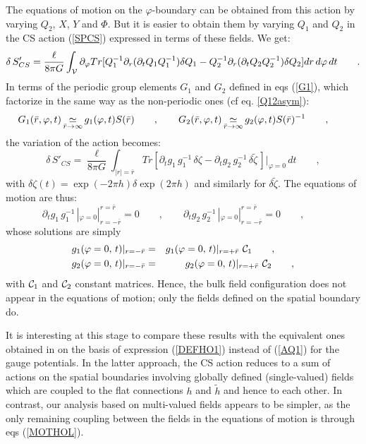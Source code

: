 \documentclass[a4paper,10pt]{article}
\begin{document}
The equations of motion on the $\varphi$-boundary can be obtained from this
action by varying $Q_2$, $X$, $Y$ and $\Phi$. But it is easier to obtain 
them by varying $Q_1$ and $Q_2$ in the CS action (\ref{SPCS}) 
expressed in terms of these fields. We get:
\begin{equation}
\delta \, S'_{CS}= 
\frac \ell {8 \pi G} \int_{\cal V} \partial _\varphi
Tr[Q_1^{-1} \partial_r(\partial_t Q_1 Q_1^{-1}) \delta Q_1 -
 Q_2^{-1} \partial_r(\partial_t Q_2 Q_2^{-1}) \delta Q_2] 
dr\,d\varphi\,dt \qquad. 
\end{equation}
In terms of the periodic group elements $G_1$ and $G_2$ defined in eqs
(\ref{G1}), which factorize in the same way as the non-periodic ones
(cf eq. \ref{Q12asym}):
\begin{equation}
G_1(\bar r,\varphi,t)\mathop {\simeq} \limits_{\bar r \rightarrow \infty}
g_1(\varphi,t) S(\bar r) \qquad , \qquad
G_2(\bar r,\varphi,t)\mathop {\simeq} \limits_{\bar r \rightarrow \infty}
g_2(\varphi,t) S(\bar r)^{-1} \qquad , \qquad \label{G12asym}
\end{equation}
the variation of the action  becomes:
\begin{equation}
\delta \, S'_{CS}= 
\frac \ell {8 \pi G} \int_{|r|=\bar r} 
Tr[\partial_t g_1 \, g_1^{-1}\, \delta \zeta -
\partial_t g_2 \, g_2^{-1} \,  \delta \tilde \zeta  \, ] |_{\varphi=0} \, 
dt \qquad ,
\end{equation}
with $\delta \zeta(t)=\exp(-2 \pi h)\delta \exp(2 \pi h)$ and similarly
for $\delta \tilde \zeta$.
The equations of motion are thus:
\begin{equation}
\label{holog}
\partial_t g_1 \, g_1^{-1} \,|_{\varphi=0} |_{r=-\bar r}^{r=\bar r}=0 \qquad , \qquad
\partial_t g_2 \,g_2^{-1} \, |_{\varphi=0} |_{r=-\bar r}^{r=\bar r}=0 \qquad ,
 \qquad
\end{equation}
whose solutions are simply
\begin{eqnarray}
\label{MOTHOL}
g_1( \varphi=0,\, t)|_{r=-\bar r}&=&
g_1( \varphi=0,\, t)|_{r=+\bar r} \,\, {\cal C}_1
\qquad,\qquad \nonumber\\
 g_2( \varphi=0,\, t)|_{r=-\bar r}&=& 
g_2(\varphi=0,\, t)|_{r=+\bar  r} \,\, {\cal C}_2
\qquad,
\end{eqnarray}
with ${\cal C}_1$ and ${\cal C}_2$ constant matrices.
Hence, the bulk field configuration does not appear in the equations of motion;
only the fields defined on the spatial boundary do. 

It is interesting at this stage to compare these results with the equivalent 
ones obtained in \cite{HMS}
on the basis of expression (\ref{DEFHO1}) instead of
(\ref{AQ1}) for the gauge potentials. In the latter approach, 
the CS action reduces to a sum of actions on the spatial boundaries
involving
globally defined (single-valued) fields which are coupled to the flat 
connections $h$ and $\tilde h$ and hence to each other.
In contrast, our analysis based on multi-valued fields appears to be simpler,
as the only remaining coupling between the fields in the equations
of motion is through
eqs (\ref{MOTHOL}).
\end{document}
